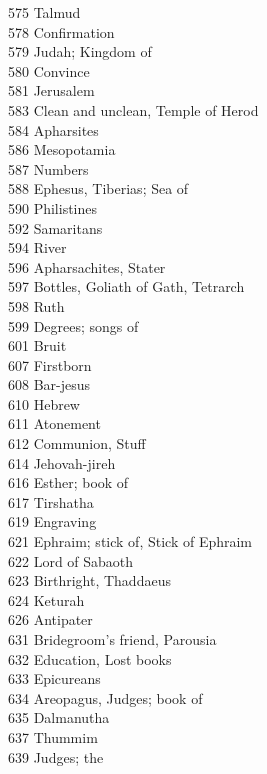 575 \quad Talmud\\
578 \quad Confirmation\\
579 \quad Judah; Kingdom of\\
580 \quad Convince\\
581 \quad Jerusalem\\
583 \quad Clean and unclean, Temple of Herod\\
584 \quad Apharsites\\
586 \quad Mesopotamia\\
587 \quad Numbers\\
588 \quad Ephesus, Tiberias; Sea of\\
590 \quad Philistines\\
592 \quad Samaritans\\
594 \quad River\\
596 \quad Apharsachites, Stater\\
597 \quad Bottles, Goliath of Gath, Tetrarch\\
598 \quad Ruth\\
599 \quad Degrees; songs of\\
601 \quad Bruit\\
607 \quad Firstborn\\
608 \quad Bar-jesus\\
610 \quad Hebrew\\
611 \quad Atonement\\
612 \quad Communion, Stuff\\
614 \quad Jehovah-jireh\\
616 \quad Esther; book of\\
617 \quad Tirshatha\\
619 \quad Engraving\\
621 \quad Ephraim; stick of, Stick of Ephraim\\
622 \quad Lord of Sabaoth\\
623 \quad Birthright, Thaddaeus\\
624 \quad Keturah\\
626 \quad Antipater\\
631 \quad Bridegroom’s friend, Parousia\\
632 \quad Education, Lost books\\
633 \quad Epicureans\\
634 \quad Areopagus, Judges; book of\\
635 \quad Dalmanutha\\
637 \quad Thummim\\
639 \quad Judges; the\\
